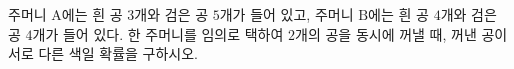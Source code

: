 주머니 $\mathrm{A}$에는 흰 공 $3$개와 검은 공 $5$개가 들어 있고, 주머니 $\mathrm{B}$에는 흰 공 $4$개와 검은 공 $4$개가 들어 있다. 한 주머니를 임의로 택하여 $2$개의 공을 동시에 꺼낼 때, 꺼낸 공이 서로 다른 색일 확률을 구하시오.
